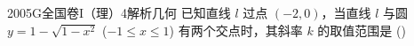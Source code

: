 
\begin{problem}{2005}{G}{全国卷I（理）}{4}{解析几何}
已知直线 $ l $ 过点 $ (-2,0) $，当直线 $ l $ 与圆 $ y=1-\sqrt{1-x^2} $ ($ -1\leq x\leq 1 $) 有两个交点时，其斜率 $ k $ 的取值范围是 (\hspace{1cm})
\begin{choices}
\end{choices}
\end{problem}

\begin{answer}

\end{answer}

\begin{solutions}

\end{solutions}